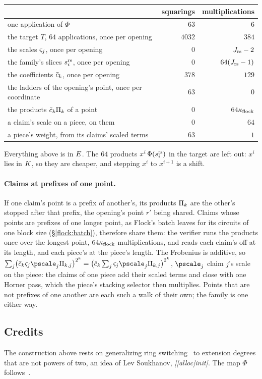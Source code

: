 \begin{center}
\begin{tabular}{lrr}
& squarings & multiplications\\[2pt]
\hline
one application of $\Phi$ & $63$ & $6$\\
the target $T$, $64$ applications, once per opening & $4032$ & $384$\\
the scales $\varsigma_j$, once per opening & $0$ & $J_{\mathrm{rs}}-2$\\
the family's slices $s^{\mathrm{rs}}_{i}$, once per opening & $0$ & $64(J_{\mathrm{rs}}-1)$\\
the coefficients $\bar c_k$, once per opening & $378$ & $129$\\
the ladders of the opening's point, once per coordinate & $63$ & $0$\\
the products $\bar c_k\Pi_k$ of a point & $0$ & $64\kappa_{\mathrm{flock}}$\\
a claim's scale on a piece, on them & $0$ & $64$\\
a piece's weight, from its claims' scaled terms & $63$ & $1$\\
\end{tabular}
\end{center}

Everything above is in $E$. The $64$ products $x^i\,\Phi(s^{\mathrm{rs}}_{i})$ in the target are left out: $x^i$ lies in $K$, so they are cheaper, and stepping $x^i$ to $x^{i+1}$ is a shift.

\paragraph{Claims at prefixes of one point.} If one claim's point is a prefix of another's, its products $\Pi_k$ are the other's stopped after that prefix, the opening's point $r'$ being shared. Claims whose points are prefixes of one longer point, as Flock's batch leaves for its circuits of one block size (\S\ref{flock:batch}), therefore share them: the verifier runs the products once over the longest point, $64\kappa_{\mathrm{flock}}$ multiplications, and reads each claim's off at its length, and each piece's at the piece's length. The Frobenius is additive, so $\sum_j\bigl(\cbar_k\rsscale_j\pscale_j\fprod_{k,j}\bigr)^{2^k}=\bigl(\cbar_k\sum_j\rsscale_j\pscale_j\fprod_{k,j}\bigr)^{2^k}$, $\pscale_j$ claim $j$'s scale on the piece: the claims of one piece add their scaled terms and close with one Horner pass, which the piece's stacking selector then multiplies. Points that are not prefixes of one another are each such a walk of their own; the family is one either way.

\subsection{Credits}\label{rs:credits}

The construction above rests on generalizing ring switching~\cite{DP24} to extension degrees that are not powers of two, an idea of Lev Soukhanov, \textit{[[alloc]init]}. The map $\Phi$ follows~\cite{Flock26}.
